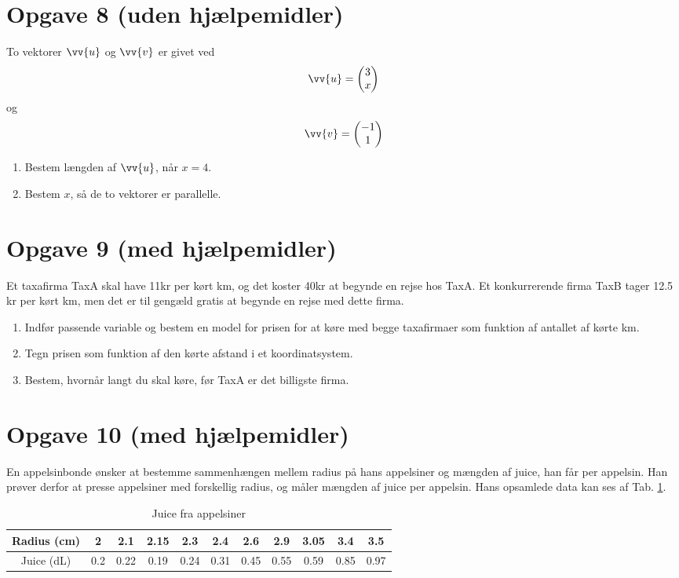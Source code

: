 \section*{Opgave 8 (uden hjælpemidler)}
To vektorer $\vv{u}$ og $\vv{v}$ er givet ved
\begin{align*}
\vv{u}= \begin{pmatrix}
 3 \\ x
\end{pmatrix} 
\end{align*}
og 
\begin{align*}
\vv{v}= \begin{pmatrix}
 -1 \\ 1
\end{pmatrix} 
\end{align*}
\begin{enumerate}[label=\roman*)]
\item Bestem længden af $\vv{u}$, når $x = 4$.
\item Bestem $x$, så de to vektorer er parallelle. 
\end{enumerate}
\section*{Opgave 9 (med hjælpemidler)}
Et taxafirma TaxA skal have 11kr per kørt km, og det koster 40kr at begynde en rejse hos TaxA. Et konkurrerende firma TaxB tager 12.5 kr per kørt km, men det er til gengæld gratis at begynde en rejse med dette firma. 
\begin{enumerate}[label=\roman*)]
\item Indfør passende variable og bestem en model for prisen for at køre med begge taxafirmaer som funktion af antallet af kørte km. 
\item Tegn prisen som funktion af den kørte afstand i et koordinatsystem. 
\item Bestem, hvornår langt du skal køre, før TaxA er det billigste firma. 
\end{enumerate}

\section*{Opgave 10 (med hjælpemidler)}
En appelsinbonde ønsker at bestemme sammenhængen mellem radius på hans appelsiner og mængden af juice, han får per appelsin. Han prøver derfor at presse appelsiner med forskellig radius, og måler mængden af juice per appelsin. Hans opsamlede data kan ses af Tab. \ref{tab:juice}.
\begin{table}[H]
\begin{tabular}{c|c|c|c|c|c|c|c|c|c|c}
Radius (cm) & 2 & 2.1 & 2.15 & 2.3 & 2.4 & 2.6 & 2.9 & 3.05 & 3.4 & 3.5\\ \hline
Juice (dL) & 0.2 & 0.22 & 0.19 &0.24 & 0.31 & 0.45 & 0.55 & 0.59 & 0.85 & 0.97
\end{tabular}
\caption{Juice fra appelsiner}
\label{tab:juice}
\end{table}


